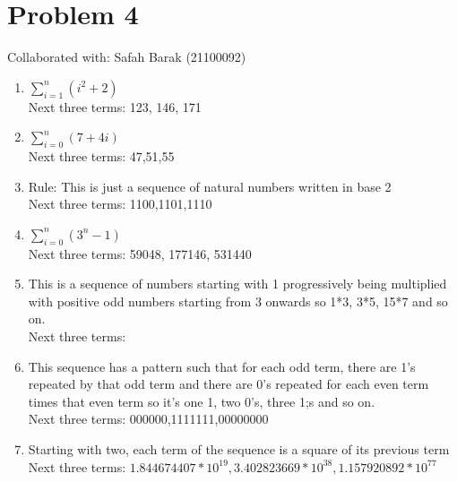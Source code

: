\documentclass{article}
\begin{document}
\section{Problem 4}
Collaborated with: Safah Barak (21100092)\\
\begin{enumerate}
\item %
$\sum\limits_{i=1}^n (i^2 +2)$ \\ Next three terms: 123, 146, 171

\item %
$\sum\limits_{i=0}^n (7+ 4i)$ \\ Next three terms: 47,51,55

\item %
Rule: This is just a sequence of natural numbers written in base 2 \\ Next three terms: 1100,1101,1110

\item %
$\sum\limits_{i=0}^n (3^n -1)$ \\Next three terms: 59048, 177146, 531440


\item %
This is a sequence of numbers starting with 1 progressively being multiplied with positive odd numbers starting from 3 onwards so 1*3, 3*5, 15*7 and so on. \\Next three terms: 

\item %
This sequence has a pattern such that for each odd term, there are 1's repeated by that odd term and there are 0's repeated for each even term times that even term so it's one 1, two 0's, three 1;s and so on.\\Next three terms: 000000,1111111,00000000

\item %
Starting with two, each term of the sequence is a square of its previous term\\Next three terms: $1.844674407*10^{19}, 3.402823669*10^{38}, 1.157920892*10^{77}$ 

\end{enumerate}
\end{document}
